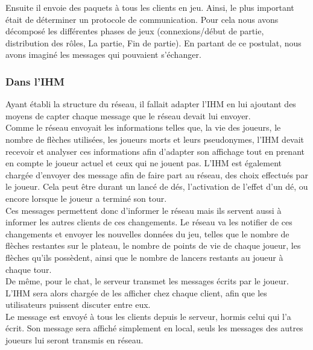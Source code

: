 \documentclass[a4paper,11pt]{article}
\begin{document}
    Ensuite il envoie des paquets à tous les clients en jeu. Ainsi, le plus important était de déterminer un protocole de communication. Pour cela nous avons décomposé les différentes phases de jeux (connexions/début de partie, distribution des rôles, La partie, Fin de partie). En partant de ce postulat, nous avons imaginé les messages qui pouvaient s’échanger.

\newpage


\subsubsection{Dans l'IHM}

    Ayant établi la structure du réseau, il fallait adapter l'IHM en lui ajoutant des moyens de capter chaque message que le réseau devait lui envoyer. \\

    Comme le réseau envoyait les informations telles que, la vie des joueurs, le nombre de flèches utilisées, les joueurs morts et leurs pseudonymes, l’IHM devait recevoir et analyser ces informations afin d’adapter son affichage tout en prenant en compte le joueur actuel et ceux qui ne jouent pas.
    L’IHM est également chargée d’envoyer des message afin de faire part au réseau, des choix effectués par le joueur. Cela peut être durant un lancé de dés, l’activation de l'effet d’un dé, ou encore lorsque le joueur a terminé son tour. \\

    Ces messages permettent donc d’informer le réseau mais ils servent aussi à informer les autres clients de ces changements. Le réseau va les notifier de ces changements et envoyer les nouvelles données du jeu, telles que le nombre de flèches restantes sur le plateau, le nombre de points de vie de chaque joueur, les flèches qu’ils possèdent, ainsi que le nombre de lancers restants au joueur à chaque tour. \\

    De même, pour le chat, le serveur transmet les messages écrits par le joueur. L’IHM sera alors chargée de les afficher chez chaque client, afin que les utilisateurs puissent discuter entre eux. \\

    Le message est envoyé à tous les clients depuis le serveur, hormis celui qui l’a écrit. Son message sera affiché simplement en local, seuls les messages des autres joueurs lui seront transmis en réseau. \\
\end{document}
